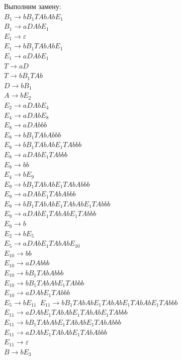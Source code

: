 \documentclass[a4paper,14pt]{extarticle}
\begin{document}
\begin{enumerate}[1.]
Выполним замену:\\
$B_1 \rightarrow bB_1TAbAbE_1$\\
$B_1 \rightarrow aDAbE_1$\\
$E_1 \rightarrow \varepsilon$\\
$E_1 \rightarrow bB_1TAbAbE_1$\\
$E_1 \rightarrow aDAbE_1$\\
$T \rightarrow aD$\\ 
$T \rightarrow bB_1TAb$\\
$D \rightarrow bB_1$\\
$A \rightarrow bE_2$\\
$E_2 \rightarrow aDAbE_4$\\
$E_4 \rightarrow aDAbE_8$\\
$E_8 \rightarrow aDAbbb$\\
$E_8 \rightarrow bB_1TAbAbbb$\\
$E_8 \rightarrow bB_1TAbAbE_1TAbbb$\\
$E_8 \rightarrow aDAbE_1TAbbb$\\
$E_8 \rightarrow bb$\\
$E_4 \rightarrow bE_9$\\
$E_9 \rightarrow bB_1TAbAbE_1TAbAbbb$\\
$E_9 \rightarrow aDAbE_1TAbAbbb$\\
$E_9 \rightarrow bB_1TAbAbE_1TAbAbE_1TAbbb$\\
$E_9 \rightarrow aDAbE_1TAbAbE_1TAbbb$\\
$E_9 \rightarrow b$\\
$E_2 \rightarrow bE_5$\\
$E_5 \rightarrow aDAbE_1TAbAbE_{10}$\\
$E_{10} \rightarrow bb$\\
$E_{10} \rightarrow aDAbbb$\\
$E_{10} \rightarrow bB_1TAbAbbb$\\
$E_{10} \rightarrow bB_1TAbAbE_1TAbbb$\\
$E_{10} \rightarrow aDAbE_1TAbbb$\\
$E_5 \rightarrow bE_{11}$\
$E_{11} \rightarrow bB_1TAbAbE_1TAbAbE_1TAbAbE_1TAbbb$\\
$E_{11} \rightarrow aDAbE_1TAbAbE_1TAbAbE_1TAbbb$\\
$E_{11} \rightarrow bB_1TAbAbE_1TAbAbE_1TAbAbbb$\\
$E_{11} \rightarrow aDAbE_1TAbAbE_1TAbAbbb$\\
$E_{11} \rightarrow \varepsilon$\\
$B \rightarrow bE_3$\\ 

\end{enumerate}
\end{document}
